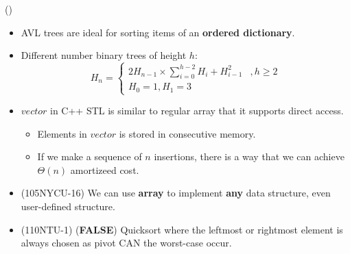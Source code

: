 \item \begin{theorem}{()} \quad\quad \begin{itemize}
        \item AVL trees are ideal for sorting items of an \textbf{ordered dictionary}.
        \item Different number binary trees of height $h$: \begin{equation}
            H_n = \begin{cases}
                2H_{n - 1} \times \sum\limits_{i = 0}^{h - 2}H_i + H_{i - 1}^2 &, h \ge 2\\
                H_0 = 1, H_1 = 3 
            \end{cases}
        \end{equation}
        \item $vector$ in C++ STL is similar to regular array that it supports direct access. \begin{itemize}
            \item Elements in $vector$ is stored in consecutive memory.
            \item If we make a sequence of $n$ insertions, there is a way that we can achieve $\Theta(n)$ amortizeed cost. 
        \end{itemize}
        \item (105NYCU-16) We can use \textbf{array} to implement \textbf{any} data structure, even user-defined structure.
        \item (110NTU-1) (\textbf{FALSE}) Quicksort where the leftmost or rightmost element is always chosen as pivot CAN the worst-case occur.
    \end{itemize}
\end{theorem}